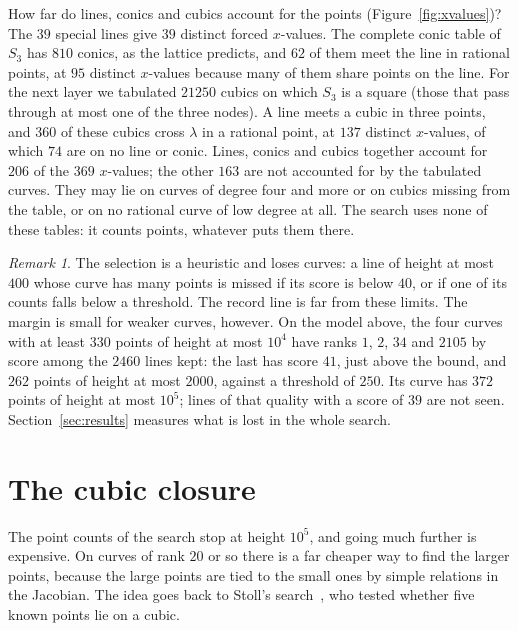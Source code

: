 \documentclass[11pt]{article}
\theoremstyle{remark}
\newtheorem*{remark*}{Remark}
\begin{document}
How far do lines, conics and cubics account for the points (Figure~\ref{fig:xvalues})?  The $39$ special lines give $39$ distinct forced
$x$-values.  The complete conic table of $S_3$ has $810$ conics, as the lattice predicts, and $62$ of them meet the line in rational
points, at $95$ distinct $x$-values because many of them share points on the line.  For the next layer we tabulated $21250$ cubics
on which $S_3$ is a square (those that pass through at most one of the three nodes).  A line meets a cubic in three points, and $360$ of these cubics cross $\lambda$ in a rational point, at
$137$ distinct $x$-values, of which $74$ are on no line or conic.  Lines, conics and cubics together account for $206$ of
the $369$ $x$-values; the other $163$ are not accounted for by the tabulated curves.  They may lie on curves of degree four and more or on cubics
missing from the table, or on no rational curve of low degree at all.  The search uses none of these tables: it counts points, whatever puts them there.

\begin{remark*}
The selection is a heuristic and loses curves: a line of height at most $400$ whose curve has many points is missed if its score
is below $40$, or if one of its counts falls below a threshold.  The record line is far from these limits.  The margin is
small for weaker curves, however.  On the model above, the four curves with at least $330$ points of height at most $10^4$ have
ranks $1$, $2$, $34$ and $2105$ by score among the $2460$ lines kept: the last has score $41$, just above the bound, and $262$
points of height at most $2000$, against a threshold of $250$.  Its curve has $372$ points of height at most $10^5$; lines of that
quality with a score of $39$ are not seen.  Section~\ref{sec:results} measures what is lost in the whole search.
\end{remark*}

\section{The cubic closure}\label{sec:closure}

The point counts of the search stop at height $10^5$, and going much further is expensive.  On curves of rank $20$ or so there is
a far cheaper way to find the larger points, because the large points are tied to the small ones by simple relations in the Jacobian.  The idea goes back to Stoll's search~\cite{StollAvg},
who tested whether five known points lie on a cubic.
\end{document}
